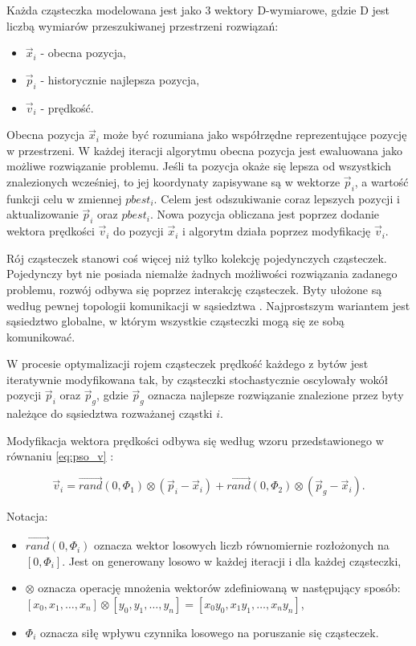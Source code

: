 \documentclass[11pt,a4paper,oneside]{report}
\begin{document}
Każda cząsteczka modelowana jest jako 3 wektory D-wymiarowe, gdzie D jest liczbą wymiarów przeszukiwanej przestrzeni rozwiązań:

\begin{itemize}
\item $\vec{x}_{i}$ - obecna pozycja,
\item $\vec{p}_{i}$ - historycznie najlepsza pozycja,
\item $\vec{v}_{i}$ - prędkość.
\end{itemize}

Obecna pozycja $\vec{x}_{i}$ może być rozumiana jako współrzędne reprezentujące pozycję w przestrzeni. W każdej iteracji algorytmu obecna pozycja jest ewaluowana jako możliwe rozwiązanie problemu. Jeśli ta pozycja okaże się lepsza od wszystkich znalezionych wcześniej, to jej koordynaty zapisywane są w wektorze $\vec{p}_{i}$, a wartość funkcji celu w zmiennej $pbest_{i}$. Celem jest odszukiwanie coraz lepszych pozycji i aktualizowanie $\vec{p}_{i}$ oraz $pbest_{i}$. Nowa pozycja obliczana jest poprzez dodanie wektora prędkości $\vec{v}_{i}$ do pozycji $\vec{x}_{i}$ i algorytm działa poprzez modyfikację $\vec{v}_{i}$.

Rój cząsteczek stanowi coś więcej niż tylko kolekcję pojedynczych cząsteczek. Pojedynczy byt nie posiada niemalże żadnych możliwości rozwiązania zadanego problemu, rozwój odbywa się poprzez interakcję cząsteczek. Byty ułożone są według pewnej topologii komunikacji w sąsiedztwa \cite{kennedy2010particle}. Najprostszym wariantem jest sąsiedztwo globalne, w którym wszystkie cząsteczki mogą się ze sobą komunikować. 

W procesie optymalizacji rojem cząsteczek prędkość każdego z bytów jest iteratywnie modyfikowana tak, by cząsteczki stochastycznie oscylowały wokół pozycji $\vec{p}_{i}$ oraz $\vec{p}_{g}$, gdzie $\vec{p}_{g}$ oznacza najlepsze rozwiązanie znalezione przez byty należące do sąsiedztwa rozważanej cząstki $i$.

Modyfikacja wektora prędkości odbywa się według wzoru przedstawionego w równaniu \eqref{eq:pso_v} \cite{poli2007particle}:

\begin{equation}
\label{eq:pso_v}
\vec{v}_{i} = \vec{rand}(0, \varPhi_{1}) \otimes (\vec{p}_{i} - \vec{x}_{i}) + \vec{rand}(0, \varPhi_{2}) \otimes (\vec{p}_{g} - \vec{x}_{i}).
\end{equation}

Notacja:

\begin{itemize}
\item $\vec{rand}(0, \varPhi_{i})$ oznacza wektor losowych liczb równomiernie rozłożonych na $[0, \varPhi_{i}]$. Jest on generowany losowo w każdej iteracji i dla każdej cząsteczki,
\item $\otimes$ oznacza operację mnożenia wektorów zdefiniowaną w następujący sposób: $[x_0, x_1, \ldots, x_n] \otimes [y_0, y_1, \ldots, y_n] = [x_0 y_0,  x_1 y_1, \ldots, x_n y_n]$,
\item $\varPhi_{i}$ oznacza siłę wpływu czynnika losowego na poruszanie się cząsteczek.
\end{itemize}
\end{document}
